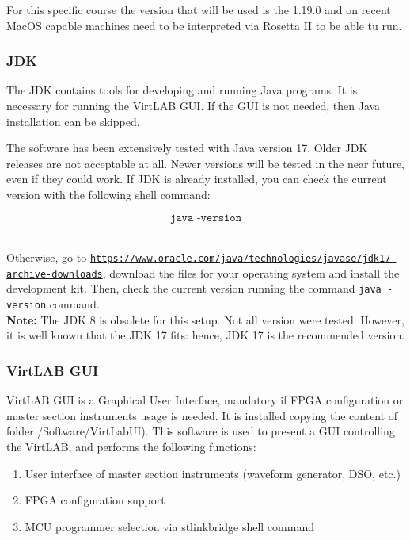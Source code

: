 \documentclass[../main.tex]{subfiles}
\begin{document}
For this specific course the version that will be used is the 1.19.0 and on recent MacOS capable machines need to be interpreted via Rosetta II to be able tu run.\\

\subsubsection*{JDK}


The JDK contains tools for developing and running Java programs. It is necessary for running the VirtLAB GUI. If the GUI is not needed, then Java installation can be skipped. 

The software has been extensively tested with Java version 17. Older JDK releases are not acceptable at all. Newer versions will be tested in the near future, even if they could work. If JDK is already installed, you can check the current version with the following shell command:

\[ \texttt{java -version} \]\

Otherwise, go to \href{https://www.oracle.com/java/technologies/javase/jdk17-archive-downloads}{\texttt{https://www.oracle.com/java/technologies/javase/jdk17-archive-downloads}}, download the files for your operating system and install the development kit. 
Then, check the current version running the command \texttt{java -version} command.\\

\textbf{Note:} The JDK 8 is obsolete for this setup. Not all version were tested. However, it is well known that the JDK 17 fits: hence, JDK 17 is the recommended version.

\subsubsection*{VirtLAB GUI}


VirtLAB GUI is a Graphical User Interface, mandatory if FPGA configuration or master section instruments usage is needed. It is installed copying the content of folder /Software/VirtLabUI). This software is used to present a GUI controlling the VirtLAB, and performs the following functions:

\begin{enumerate}[label=\textbf{-}]
	\item  User interface of master section instruments (waveform generator, DSO, etc.)
	\item FPGA configuration support
	\item MCU programmer selection via stlinkbridge shell command
\end{enumerate}
\end{document}

